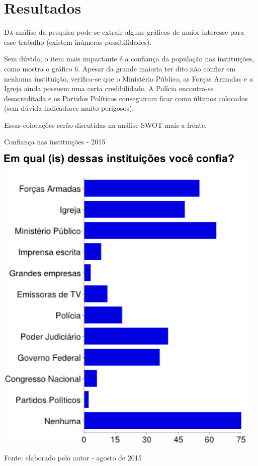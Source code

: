 \documentclass[
	12pt,				%
	openright,			%
	twoside,			%
	a4paper,			%
	chapter=TITLE,		%
	section=TITLE,		%
	subsection=TITLE,	%
	subsubsection=TITLE,%
	spanish,            %
	english,			%
	brazil				%
	]{abntex2}
\begin{document}
\section{Resultados}
\lettrine[lines=2, lhang=0.33, loversize=0.25]{D}{a} análise da pesquisa pode-se extrair alguns gráficos de maior interesse para esse trabalho (existem inúmeras possibilidades). 
\par
Sem dúvida, o item mais impactante é a confiança da população nas instituições, como mostra o gráfico 6. Apesar da grande maioria ter dito não confiar em nenhuma instituição, verifica-se que o Ministério Público, as Forças Armadas e a Igreja ainda possuem uma certa credibilidade. A Polícia encontra-se desacreditada e os Partidos Políticos conseguiram ficar como últimos colocados (sem dúvida indicadores muito perigosos).
\par
Essas colocações serão discutidas na análise SWOT mais a frente.
\par
\begin{grafico}[!htpb]
	\begin{center}
	\caption{Confiança nas instituições - 2015}
	\includegraphics[scale=0.4]{confianca.png}
	\end{center}
	\ABNTEXchapterfont\small{Fonte: elaborado pelo autor - agosto de 2015}
	\label{Confiança}
\end{grafico}
\end{document}

